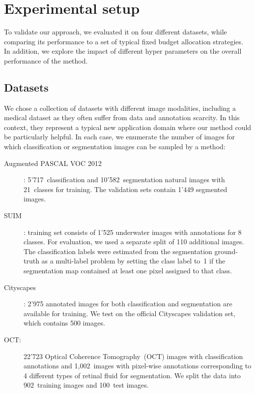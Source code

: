 \section{Experimental setup}
\label{sec:experiments_fullweak}

To validate our approach, we evaluated it on four different datasets, while comparing its performance to a set of typical fixed budget allocation strategies. In addition, we explore the impact of different hyper parameters on the overall performance of the method. 

\subsection{Datasets} 
We chose a collection of datasets with different image modalities, including a medical dataset as they often suffer from data and annotation scarcity. In this context, they represent a typical new application domain where our method could be particularly helpful. In each case, we enumerate the number of images for which classification or segmentation images can be sampled by a method:
\begin{description}
    \item[Augmented PASCAL VOC 2012]: 5'717~classification and 10'582~segmentation natural images with 21~classes for training. The validation sets contain 1'449 segmented images.
    \item[SUIM]: training set consists of 1'525 underwater images with annotations for 8 classes. For evaluation, we used a separate split of 110 additional images. The classification labels were estimated from the segmentation ground-truth as a multi-label problem by setting the class label to~1 if the segmentation map contained at least one pixel assigned to that class.
    \item[Cityscapes]: 2'975 annotated images for both classification and segmentation are available for training. We test on the official Cityscapes validation set, which contains 500 images. 
    \item[OCT:] 22'723 Optical Coherence Tomography~(OCT) images with classification annotations and 1,002~images with pixel-wise annotations corresponding to 4 different types of retinal fluid for segmentation. We split the data into 902~training images and 100~test images.
\end{description}

